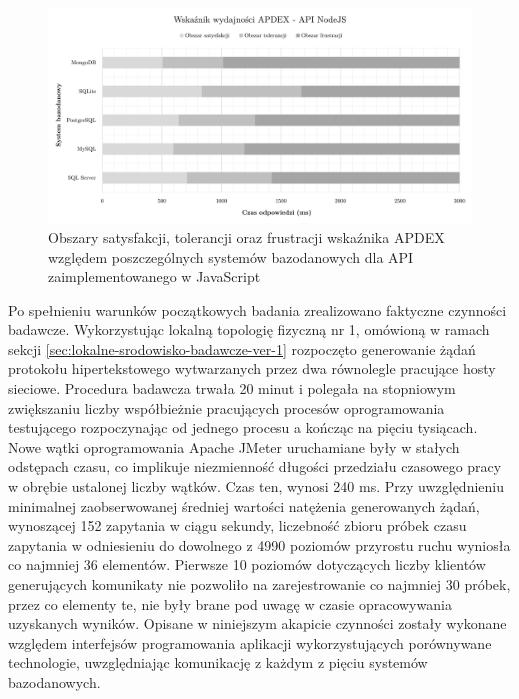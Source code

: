\clearpage

\begin{figure}[htb]
    \centering
     \includegraphics[width=\linewidth]{rys05/apdex-nodejs.pdf}
    \caption{Obszary satysfakcji, tolerancji oraz frustracji wskaźnika APDEX względem poszczególnych systemów bazodanowych dla API zaimplementowanego w JavaScript}
    \label{fig:apdex-nodejs}
\end{figure}

Po spełnieniu warunków początkowych badania zrealizowano faktyczne czynności badawcze. Wykorzystując lokalną topologię fizyczną nr 1, omówioną w ramach sekcji \ref{sec:lokalne-srodowisko-badawcze-ver-1} rozpoczęto generowanie żądań protokołu hipertekstowego wytwarzanych przez dwa równolegle pracujące hosty sieciowe. Procedura badawcza trwała 20 minut i polegała na stopniowym zwiększaniu liczby współbieżnie pracujących procesów oprogramowania testującego rozpoczynając od jednego procesu a kończąc na pięciu tysiącach. Nowe wątki oprogramowania Apache JMeter uruchamiane były w stałych odstępach czasu, co implikuje niezmienność długości przedziału czasowego pracy w obrębie ustalonej liczby wątków. Czas ten, wynosi 240 ms. Przy uwzględnieniu minimalnej zaobserwowanej średniej wartości natężenia generowanych żądań, wynoszącej 152 zapytania w ciągu sekundy, liczebność zbioru próbek czasu zapytania w odniesieniu do dowolnego z 4990 poziomów przyrostu ruchu wyniosła co najmniej 36 elementów. Pierwsze 10 poziomów dotyczących liczby klientów generujących komunikaty nie pozwoliło na zarejestrowanie co najmniej 30 próbek, przez co elementy te, nie były brane pod uwagę w czasie opracowywania uzyskanych wyników. Opisane w niniejszym akapicie czynności zostały wykonane względem interfejsów programowania aplikacji wykorzystujących porównywane technologie, uwzględniając komunikację z każdym z pięciu systemów bazodanowych.

